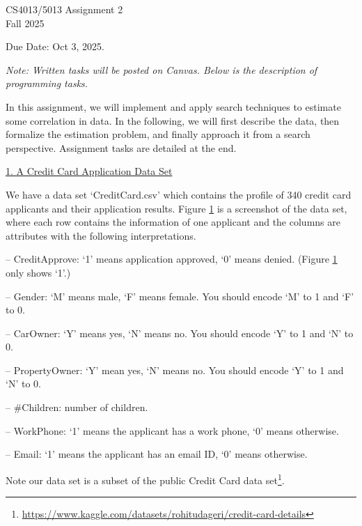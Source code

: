 \documentclass[a4paper, 11pt]{article}
\begin{document}
\begin{center}
\Large  CS4013/5013 Assignment 2\\[1em]
\large Fall 2025\\[1em] 
\end{center}

\vspace{20pt}

Due Date: Oct 3, 2025. 

\textit{Note: Written tasks will be posted 
on Canvas. Below is the description of 
programming tasks.}  




In this assignment, we will implement and apply 
search techniques to estimate some correlation in data.  
In the following, we will first describe the data, 
then formalize the estimation problem, and finally 
approach it from a search perspective. Assignment tasks 
are detailed at the end. 

\underline{1. A Credit Card Application Data Set}

We have a data set `CreditCard.csv' which contains 
the profile of 340 credit card applicants and their 
application results. Figure \ref{fig:hw2} is a 
screenshot of the data set, where each row contains 
the information of one applicant and the columns are attributes with the following interpretations. 

-- CreditApprove: `1' means application 
approved, `0' means denied. (Figure \ref{fig:hw2}
only shows `1'.)

-- Gender: `M' means male, `F' means female. 
You should encode `M' to 1 and `F' to 0. 

-- CarOwner: `Y' means yes, `N' means no. 
You should encode `Y' to 1 and `N' to 0. 

-- PropertyOwner: `Y' mean yes, `N' means no. 
You should encode `Y' to 1 and `N' to 0. 

-- \#Children: number of children. 

-- WorkPhone: `1' means the applicant has a 
work phone, `0' means otherwise. 

-- Email: `1' means the applicant has an 
email ID, `0' means otherwise. 

Note our data set is a subset of the public Credit Card data 
set\footnote{\url{https://www.kaggle.com/datasets/rohitudageri/credit-card-details}}. 

\begin{figure}[t!]
    \centering
    \caption{}
    \label{fig:hw2}
\end{figure}
\end{document}

